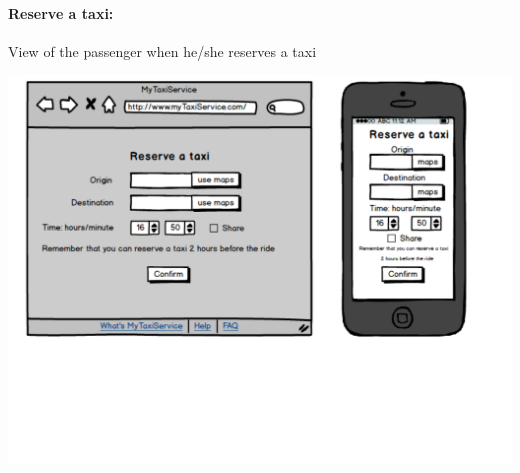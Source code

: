 \paragraph{Reserve a taxi:}
View of the passenger when he/she reserves a taxi
\begin{center}
	\includegraphics[width=\textwidth]{mockup/reserve.pdf}
\end{center}

